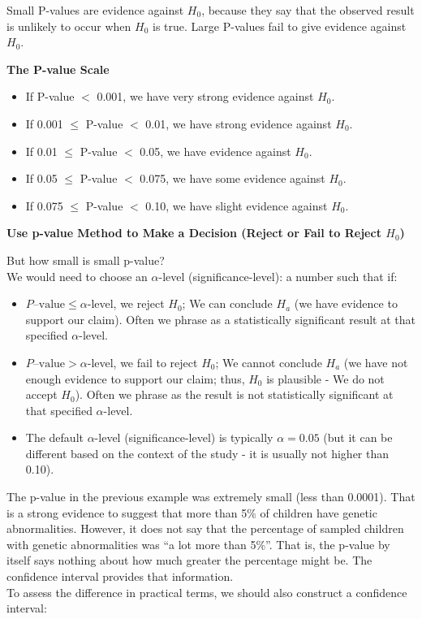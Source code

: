 Small P-values are evidence against $H_0$, because they say that the observed result is unlikely to occur when $H_0$ is true. Large P-values fail to give evidence against $H_0$.

\vspace{1em}
\textbf{The P-value Scale}
\begin{itemize}
  \item If P-value $<$ 0.001, we have very strong evidence against $H_0$.
  \item If 0.001 $\leq$ P-value $<$ 0.01, we have strong evidence against $H_0$.
  \item If 0.01 $\leq$ P-value $<$ 0.05, we have evidence against $H_0$.
  \item If 0.05 $\leq$ P-value $<$ 0.075, we have some evidence against $H_0$.
  \item If 0.075 $\leq$ P-value $<$ 0.10, we have slight evidence against $H_0$.
\end{itemize}
\textbf{Use p-value Method to Make a Decision (Reject or Fail to Reject $H_0$)}

But how small is small p-value?\\
We would need to choose an $\alpha$-level (significance-level): a number such that if:

\begin{itemize}
  \item $P\text{–value} \leq \alpha$-level, we reject $H_0$; We can conclude $H_a$ (we have evidence to support our claim). Often we phrase as a statistically significant result at that specified $\alpha$-level.
  \item $P\text{–value} > \alpha$-level, we fail to reject $H_0$; We cannot conclude $H_a$ (we have not enough evidence to support our claim; thus, $H_0$ is plausible - We do not accept $H_0$). Often we phrase as the result is not statistically significant at that specified $\alpha$-level.
  \item The default $\alpha$-level (significance-level) is typically $\alpha = 0.05$ (but it can be different based on the context of the study - it is usually not higher than 0.10).
\end{itemize}
The p-value in the previous example was extremely small (less than 0.0001). That is a strong evidence to suggest that more than 5\% of children have genetic abnormalities. However, it does not say that the percentage of sampled children with genetic abnormalities was ``a lot more than 5\%''. That is, the p-value by itself says nothing about how much greater the percentage might be. The confidence interval provides that information.\\
To assess the difference in practical terms, we should also construct a confidence interval:

